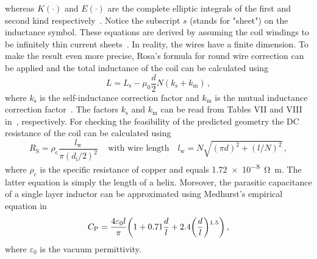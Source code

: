 whereas $K(\cdot)$ and $E(\cdot)$ are the complete elliptic integrals of the first and second kind respectively~\cite{nagaoka}. Notice the subscript $s$ (stands for "sheet") on the inductance symbol. These equations are derived by assuming the coil windings to be infinitely thin current sheets~\cite{rosa}. In reality, the wires have a finite dimension. To make the result even more precise, Rosa's formula for round wire correction can be applied and the total inductance of the coil can be calculated using
\begin{equation}\label{eqn:aircoil2}
	L = L_\mathrm{s} - \mu_0\frac{d}{2}N(k_\mathrm{s}+k_\mathrm{m})\,,
\end{equation}
where $k_\mathrm{s}$ is the self-inductance correction factor and $k_\mathrm{m}$ is the mutual inductance correction factor~\cite{rosa}. The factors $k_\mathrm{s}$ and  $k_\mathrm{m}$ can be read from Tables VII and VIII in~\cite{rosa}, respectively. For checking the feasibility of the predicted geometry the DC resistance of the coil can be calculated using 
\begin{equation} \label{eqn:aircoil3}
	R_\mathrm{S} = \rho_\mathrm{c}\frac{l_\mathrm{w}}{\pi (d_\mathrm{i}/2)^2}\,
	\quad \text{with wire length} \quad 
	l_\mathrm{w} = N\sqrt{(\pi d)^2+(l/N)^2}\,,
\end{equation}
where $\rho_\mathrm{c}$ is the specific resistance of copper and equals \SI{1.72e-8}{\ohm\meter}. The latter equation is simply the length of a helix. Moreover, the parasitic capacitance of a single layer inductor can be approximated using Medhurst's empirical equation in~\cite{medhurst} 
\begin{equation} \label{eqn:aircoil4}
	C_\mathrm{P} = \frac{4\varepsilon_0l}{\pi}\left(1+0.71\frac{d}{l}+2.4\left(\frac{d}{l}\right)\strut^{1.5}\right)\,,
\end{equation}
where $\varepsilon_0$ is the vacuum permittivity.

